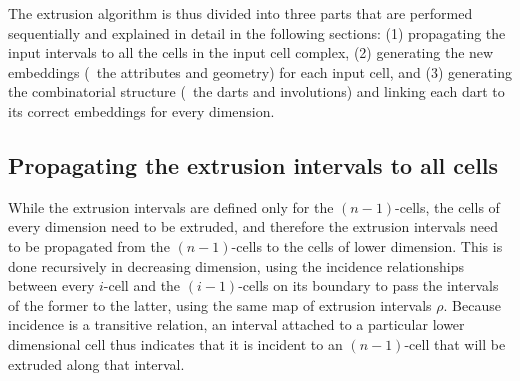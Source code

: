 The extrusion algorithm is thus divided into three parts that are performed sequentially and explained in detail in the following sections: (1) propagating the input intervals to all the cells in the input cell complex, (2) generating the new embeddings (\ie\ the attributes and geometry) for each input cell, and (3) generating the combinatorial structure (\ie\ the darts and involutions) and linking each dart to its correct embeddings for every dimension.

\subsection{Propagating the extrusion intervals to all cells}
\label{ss:propagation}

While the extrusion intervals are defined only for the $(n-1)$-cells, the cells of every dimension need to be extruded, and therefore the extrusion intervals need to be propagated from the $(n-1)$-cells to the cells of lower dimension.
This is done recursively in decreasing dimension, using the incidence relationships between every $i$-cell and the $(i-1)$-cells on its boundary to pass the intervals of the former to the latter, using the same map of extrusion intervals $\rho$.
Because incidence is a transitive relation, an interval attached to a particular lower dimensional cell thus indicates that it is incident to an $(n-1)$-cell that will be extruded along that interval.

